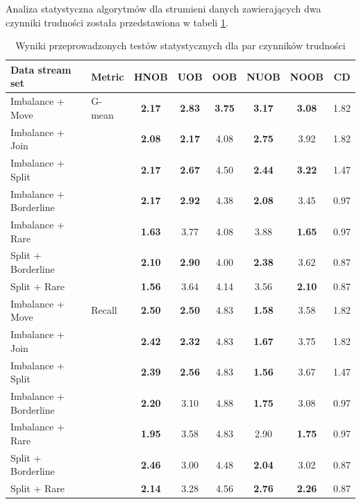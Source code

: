 Analiza statystyczna algorytmów dla strumieni danych zawierających dwa czynniki trudności została przedstawiona w tabeli \ref{Tab:DoubleDriftFriedmanHNOB}.

\newpage

\begin{table}[ht]
\centering\small%
\setlength{\tabcolsep}{10pt} 
\renewcommand{\arraystretch}{1.5} 
\begin{tabular}{l l c c c c c c}
\toprule
Data stream set & Metric & HNOB & UOB & OOB & NUOB & NOOB & CD \\
\midrule
Imbalance + Move & G-mean & \textbf{2.17} & \textbf{2.83} & \textbf{3.75} & \textbf{3.17} & \textbf{3.08} & 1.82 \\
Imbalance + Join  & & \textbf{2.08} & \textbf{2.17} & 4.08 & \textbf{2.75} & 3.92 & 1.82 \\
Imbalance + Split  & & \textbf{2.17} & \textbf{2.67} & 4.50 & \textbf{2.44} & \textbf{3.22} & 1.47 \\
Imbalance + Borderline  & & \textbf{2.17} & \textbf{2.92} & 4.38 & \textbf{2.08} & 3.45 & 0.97 \\
Imbalance + Rare  & & \textbf{1.63} & 3.77 & 4.08 & 3.88 & \textbf{1.65} & 0.97 \\
Split + Borderline  & & \textbf{2.10} & \textbf{2.90} & 4.00 & \textbf{2.38} & 3.62 & 0.87 \\
Split + Rare  & & \textbf{1.56} & 3.64 & 4.14 & 3.56 & \textbf{2.10} & 0.87 \\
Imbalance + Move & Recall & \textbf{2.50} & \textbf{2.50} & 4.83 & \textbf{1.58} & 3.58 & 1.82 \\
Imbalance + Join  & & \textbf{2.42} & \textbf{2.32} & 4.83 & \textbf{1.67} & 3.75 & 1.82 \\
Imbalance + Split  & & \textbf{2.39} & \textbf{2.56} & 4.83 & \textbf{1.56} & 3.67 & 1.47 \\
Imbalance + Borderline  & & \textbf{2.20} & 3.10 & 4.88 & \textbf{1.75} & 3.08 & 0.97 \\
Imbalance + Rare  & & \textbf{1.95} & 3.58 & 4.83 & 2.90 & \textbf{1.75} & 0.97 \\
Split + Borderline  & & \textbf{2.46} & 3.00 & 4.48 & \textbf{2.04} & 3.02 & 0.87 \\
Split + Rare  & & \textbf{2.14} & 3.28 & 4.56 & \textbf{2.76} & \textbf{2.26} & 0.87 \\
\bottomrule
\end{tabular}
\caption{Wyniki przeprowadzonych testów statystycznych dla par czynników trudności}\label{Tab:DoubleDriftFriedmanHNOB}
\end{table}

